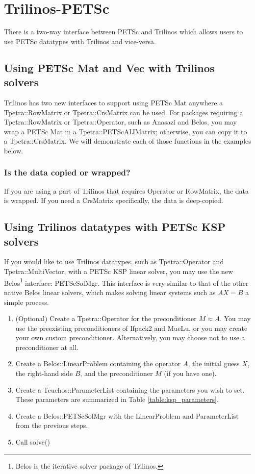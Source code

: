 \section{Trilinos-PETSc}
There is a two-way interface between PETSc and Trilinos which allows users to
use PETSc datatypes with Trilinos and vice-versa.

\subsection{Using PETSc Mat and Vec with Trilinos solvers}
Trilinos has two new interfaces to support using PETSc Mat anywhere
a Tpetra::RowMatrix or Tpetra::CrsMatrix can be used.  For packages requiring a
Tpetra::RowMatrix or Tpetra::Operator, such as Anasazi and Belos, you may wrap a
PETSc Mat in a Tpetra::PETScAIJMatrix; otherwise, you can copy it to a
Tpetra::CrsMatrix.  We will demonstrate each of those functions in the examples
below.





\subsubsection{Is the data copied or wrapped?}
If you are using a part of Trilinos that requires Operator or RowMatrix, the
data is wrapped.  If you need a CrsMatrix specifically, the data is deep-copied.

\subsection{Using Trilinos datatypes with PETSc KSP solvers}
If you would like to use Trilinos datatypes, such as Tpetra::Operator and
Tpetra::MultiVector, with a PETSc KSP linear solver, you may use the new
Belos\footnote{Belos is the iterative solver package of Trilinos.} interface:
PETScSolMgr.  This interface is very similar to that of the other native Belos
linear solvers, which makes solving linear systems such as $AX=B$ a simple
process.

\begin{enumerate}
  \item (Optional) Create a Tpetra::Operator for the preconditioner $M \approx
  A$.  You may use the preexisting preconditioners of Ifpack2 and MueLu, or you
  may create your own custom preconditioner.  Alternatively, you may choose not
  to use a preconditioner at all.
  \item Create a Belos::LinearProblem containing the operator $A$, the initial
  guess $X$, the right-hand side $B$, and the preconditioner $M$ (if you have
  one).
  \item Create a Teuchos::ParameterList containing the parameters you wish to
  set.  These parameters are summarized in Table \ref{table:ksp_parameters}.
  \item Create a Belos::PETScSolMgr with the LinearProblem and ParameterList
  from the previous steps.
  \item Call solve()
\end{enumerate}

